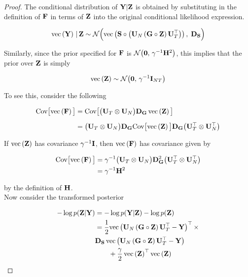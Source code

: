     
    \begin{proof}
    
    The conditional distribution of $\Y | \Z$ is obtained by substituting in the definition of $\F$ in terms of $\Z$ into the original conditional likelihood expression.  
    
    $$
    \vecc{\Y} \, | \, \Z \sim \mathcal{N}\Big(\vecc{\Ss \circ \big(\U_N \, (\G \circ \Z) \, \U_T^\top\big)}, \; \D_{\Ss}\Big)
    $$
    
    Similarly, since the prior specified for $\F$ is $\mathcal{N}\big(\zero, \, \gamma^{-1} \HH^2\big)$, this implies that the prior over $\Z$ is simply
    
    $$
    \vecc{\Z} \sim \mathcal{N}\big(\zero, \, \gamma^{-1} \I_{NT} \big) 
    $$
    
    To see this, consider the following
    
    
    \begin{align*}
    \text{Cov}\big[\vecc{\F}\big] &=  \text{Cov}\big[\big(\U_T \otimes \U_N\big) \D_\G \, \vecc{\Z}\big]  \\[0.2cm]
    &= \big(\U_T \otimes \U_N\big) \D_\G \text{Cov}\big[\vecc{\Z}\big] \D_\G \big(\U_T^\top \otimes \U_N^\top \big) 
    \end{align*}
    
    \vspace{0.2cm}
    
    If $\vecc{\Z}$ has covariance $\gamma^{-1} \I$, then $\vecc{\F}$ has covariance given by 
    
    \begin{align*}
    \text{Cov}\big[\vecc{\F}\big] &= \gamma^{-1} \big(\U_T \otimes \U_N\big) \D_\G^2 \big(\U_T^\top \otimes \U_N^\top \big) \\
    &= \gamma^{-1} \HH^{2}
    \end{align*}
    
    \noindent by the definition of $\HH$.\\
    
    Now consider the transformed posterior 
    
    \begin{align*}
    -\log p(\Z | \Y) &= -\log p(\Y | \Z) -\log p(\Z) \\
    &= \frac{1}{2} \vecc{\U_N \, (\G \circ \Z) \, \U_T^\top - \Y}^\top \times \\ &  \D_\Ss \,  \vecc{\U_N \, (\G \circ \Z) \, \U_T^\top- \Y} \\ & \quad\quad   +\frac{\gamma}{2} \, \vecc{\Z}^\top \vecc{\Z}
    \end{align*}
    

\end{proof}
